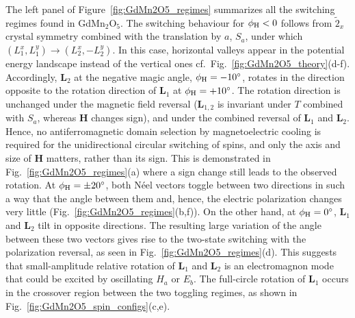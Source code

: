 The left panel of Figure~\ref{fig:GdMn2O5_regimes} summarizes all the switching regimes found in GdMn$_2$O$_5$.
%
The switching behaviour for $\phi_{\rm H} < 0$ follows from  $\tilde{2}_x$ crystal symmetry combined with the translation by $a$, $S_a$, under which $(L_1^x,L_1^y) \rightarrow (L_2^x,-L_2^y)$.
In this case, horizontal valleys appear in the potential energy landscape instead of the vertical ones cf.~Fig.~\ref{fig:GdMn2O5_theory}(d-f). Accordingly, $\bm{L}_2$ at the negative magic angle, $\phi_{\rm H} = -10^\circ$,  rotates in the direction opposite to the rotation direction of $\bm{L}_1$ at $\phi_{\rm H} = +10^\circ$. The rotation direction is unchanged under the magnetic field reversal ($\bm{L}_{1,2}$ is invariant under $T$ combined with $S_a$, whereas $\bm{H}$ changes sign), and under the combined reversal of $\bm{L}_{1}$ and $\bm{L}_{2}$.
Hence, no antiferromagnetic domain selection by magnetoelectric cooling is required for the unidirectional circular switching of spins, and only the axis and size of $\bm{H}$ matters, rather than its sign.
This is demonstrated in Fig.~\ref{fig:GdMn2O5_regimes}(a) where a sign change still leads to the observed rotation.
%
At $\phi_{\rm H} = \pm 20^\circ$, both N\'eel vectors toggle between two directions in such a way that the angle between them and, hence, the electric polarization changes very little (Fig.~\ref{fig:GdMn2O5_regimes}(b,f)). 
On the other hand, at $\phi_{\rm H}=0^\circ$, $\bm{L}_1$ and  $\bm{L}_2$ tilt in opposite directions. The resulting large variation of the angle between these two vectors gives rise to the two-state switching with the polarization reversal, as seen in Fig.~\ref{fig:GdMn2O5_regimes}(d). This suggests that small-amplitude relative rotation of $\bm{L}_1$ and $\bm{L}_2$ is an electromagnon mode that could be excited by oscillating $H_a$ or $E_b$. 
%
The full-circle rotation of  $\bm{L}_1$ occurs in the crossover region between the two toggling regimes, as shown in Fig.~\ref{fig:GdMn2O5_spin_configs}(c,e).

